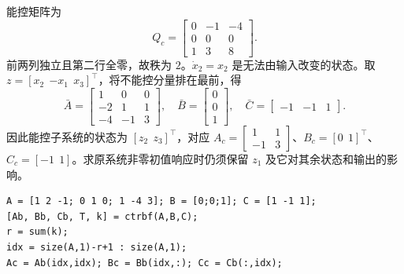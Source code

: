 

\sol 能控矩阵为
\[
    Q_c=\begin{bmatrix}0&-1&-4\\0&0&0\\1&3&8\end{bmatrix}.
\]
前两列独立且第二行全零，故秩为 $2$。$\dot x_2=x_2$ 是无法由输入改变的状态。取 $z=[x_2\ \ {-x_1}\ \ x_3]^\top$，将不能控分量排在最前，得
\[
    \bar A=\begin{bmatrix}1&0&0\\-2&1&1\\-4&-1&3\end{bmatrix},\quad
    \bar B=\begin{bmatrix}0\\0\\1\end{bmatrix},\quad
    \bar C=\begin{bmatrix}-1&-1&1\end{bmatrix}.
\]
因此能控子系统的状态为 $[z_2\ \ z_3]^\top$，对应 $A_c=\begin{bmatrix}1&1\\-1&3\end{bmatrix}$、$B_c=[0\ \ 1]^\top$、$C_c=[-1\ \ 1]$。求原系统非零初值响应时仍须保留 $z_1$ 及它对其余状态和输出的影响。
\begin{verbatim}
A = [1 2 -1; 0 1 0; 1 -4 3]; B = [0;0;1]; C = [1 -1 1];
[Ab, Bb, Cb, T, k] = ctrbf(A,B,C);
r = sum(k);
idx = size(A,1)-r+1 : size(A,1);
Ac = Ab(idx,idx); Bc = Bb(idx,:); Cc = Cb(:,idx);
\end{verbatim}


